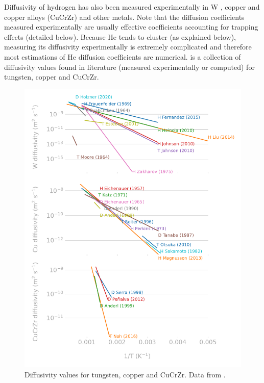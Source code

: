 Diffusivity of hydrogen has also been measured experimentally in \gls{W} , copper and copper alloys (CuCrZr)  and other metals.
Note that the diffusion coefficients measured experimentally are usually effective coefficients accounting for \gls{trapping} effects (detailed below).
Because He tends to cluster (as explained below), measuring its diffusivity experimentally is extremely complicated and therefore most estimations of He diffusion coefficients are numerical.
 is a collection of diffusivity values found in literature (measured experimentally or computed) for tungsten, copper and CuCrZr.


\begin{figure}
    \centering
    \includegraphics[width=0.75\linewidth]{Figures/Chapter1/materials_diffusivity_review_comparison.pdf}
    \caption{Diffusivity values for tungsten, copper and CuCrZr. Data from \cite{delaporte-mathurin_remdelaportemathurinh-transport-materials_2022}.}
\end{figure}


